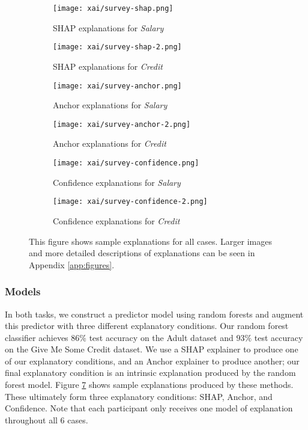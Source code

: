 \begin{figure}[htbp]
    \centering
    \begin{subfigure}[b]{0.45\textwidth}
        \texttt{[image: xai/survey-shap.png]}
        \caption{SHAP explanations for \emph{Salary}}
        \label{fig:shapsalary}
    \end{subfigure}
    \hfill
    \begin{subfigure}[b]{0.45\textwidth}
        \texttt{[image: xai/survey-shap-2.png]}
        \caption{SHAP explanations for \emph{Credit}}
        \label{fig:shapcredit}
    \end{subfigure}
    \medskip
    \begin{subfigure}[b]{0.45\textwidth}
        \texttt{[image: xai/survey-anchor.png]}
        \caption{Anchor explanations for \emph{Salary}}
        \label{fig:anchorsalary}
    \end{subfigure}
    \hfill
    \begin{subfigure}[b]{0.45\textwidth}
        \texttt{[image: xai/survey-anchor-2.png]}
        \caption{Anchor explanations for \emph{Credit}}
        \label{fig:anchorcredit}
    \end{subfigure}
    \medskip
    \begin{subfigure}[b]{0.45\textwidth}
        \texttt{[image: xai/survey-confidence.png]}
        \caption{Confidence explanations for \emph{Salary}}
        \label{fig:confidencesalary}
    \end{subfigure}
    \hfill
    \begin{subfigure}[b]{0.45\textwidth}
        \texttt{[image: xai/survey-confidence-2.png]}
        \caption{Confidence explanations for \emph{Credit}}
        \label{fig:confidencecredit}
    \end{subfigure}
    \caption{This figure shows sample explanations for all cases. Larger images and more detailed descriptions of explanations can be seen in Appendix \ref{app:figures}.}
    \label{fig:online_explanations}
\end{figure}

\subsubsection{Models}
In both tasks, we construct a predictor model using random forests and augment this predictor with three different explanatory conditions. Our random forest classifier achieves $86\%$ test accuracy on the Adult dataset and $93\%$ test accuracy on the Give Me Some Credit dataset. We use a SHAP explainer to produce one of our explanatory conditions, and an Anchor explainer to produce another; our final explanatory condition is an intrinsic explanation produced by the random forest model. Figure \ref{fig:online_explanations} shows sample explanations produced by these methods. These ultimately form three explanatory conditions: SHAP, Anchor, and Confidence. Note that each participant only receives one model of explanation throughout all 6 cases. 


